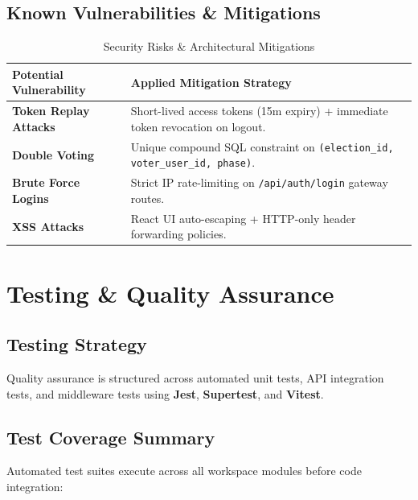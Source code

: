 \documentclass[12pt, a4paper]{article}
\begin{document}
\subsection{Known Vulnerabilities \& Mitigations}
\begin{table}[h!]
\centering
\caption{Security Risks \& Architectural Mitigations}
\renewcommand{\arraystretch}{1.3}
\begin{tabular}{@{}ll@{}}
\toprule
\textbf{Potential Vulnerability} & \textbf{Applied Mitigation Strategy} \\ \midrule
\textbf{Token Replay Attacks} & Short-lived access tokens (15m expiry) + immediate token revocation on logout. \\
\textbf{Double Voting} & Unique compound SQL constraint on \texttt{(election\_id, voter\_user\_id, phase)}. \\
\textbf{Brute Force Logins} & Strict IP rate-limiting on \texttt{/api/auth/login} gateway routes. \\
\textbf{XSS Attacks} & React UI auto-escaping + HTTP-only header forwarding policies. \\ \bottomrule
\end{tabular}
\end{table}

\section{Testing \& Quality Assurance}

\subsection{Testing Strategy}
Quality assurance is structured across automated unit tests, API integration tests, and middleware tests using \textbf{Jest}, \textbf{Supertest}, and \textbf{Vitest}.

\subsection{Test Coverage Summary}
Automated test suites execute across all workspace modules before code integration:
\end{document}
